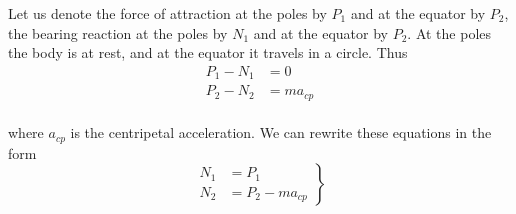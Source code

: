 \documentclass[a4paper,sfsidenotes]{tufte-book}
\begin{document}
Let us denote the force of attraction at the poles by $P_{1}$  and at the equator by $P_{2}$, the bearing reaction at the poles by $N_{1}$ and at the equator by $P_{2}$. At the poles the body is at rest, and at the equator it travels in a circle. Thus
\begin{equation*}
\begin{split}
P_{1} - N_{1} & =0\\
P_{2} - N_{2}& =ma_{cp}
\end{split}
\end{equation*}
\\
where $a_{cp}$ is the centripetal acceleration. We can rewrite these equations in the form
\\
\begin{equation} 
\left.
\begin{split}
N_{1} & = P_{1} \\
N_{2} & = P_{2} - ma_{cp}
\label{eq-46}
\end{split}
\right\}
\end{equation}
\end{document}
